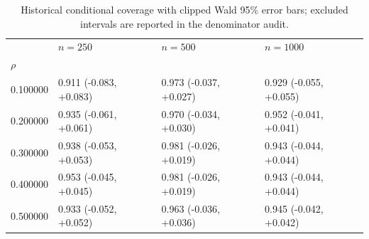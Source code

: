 \begin{table}
\caption{Historical conditional coverage with clipped Wald 95\% error bars; excluded intervals are reported in the denominator audit.}
\label{tab:experiment_details_delta_coverage_main}
\begin{tabular}{llll}
\toprule
 & $n=250$ & $n=500$ & $n=1000$ \\
$\rho$ &  &  &  \\
\midrule
0.100000 & 0.911 (-0.083, +0.083) & 0.973 (-0.037, +0.027) & 0.929 (-0.055, +0.055) \\
0.200000 & 0.935 (-0.061, +0.061) & 0.970 (-0.034, +0.030) & 0.952 (-0.041, +0.041) \\
0.300000 & 0.938 (-0.053, +0.053) & 0.981 (-0.026, +0.019) & 0.943 (-0.044, +0.044) \\
0.400000 & 0.953 (-0.045, +0.045) & 0.981 (-0.026, +0.019) & 0.943 (-0.044, +0.044) \\
0.500000 & 0.933 (-0.052, +0.052) & 0.963 (-0.036, +0.036) & 0.945 (-0.042, +0.042) \\
\bottomrule
\end{tabular}
\end{table}
